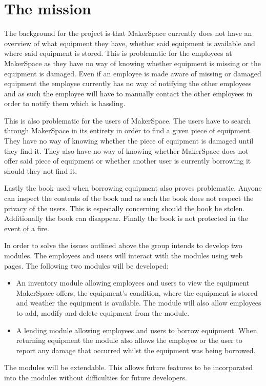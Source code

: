 \section{The mission}
The background for the project is that MakerSpace currently does not have an overview of what equipment they have, whether said equipment is available and where said equipment is stored.
This is problematic for the employees at MakerSpace as they have no way of knowing whether equipment is missing or the equipment is damaged.
Even if an employee is made aware of missing or damaged equipment the employee currently has no way of notifying the other employees and as such the employee will have to manually contact the other employees in order to notify them which is hassling.

This is also problematic for the users of MakerSpace.
The users have to search through MakerSpace in its entirety in order to find a given piece of equipment.
They have no way of knowing whether the piece of equipment is damaged until they find it.
They also have no way of knowing whether MakerSpace does not offer said piece of equipment or whether another user is currently borrowing it should they not find it.

Lastly the book used when borrowing equipment also proves problematic.
Anyone can inspect the contents of the book and as such the book does not respect the privacy of the users.
This is especially concerning should the book be stolen.
Additionally the book can disappear.
Finally the book is not protected in the event of a fire.

In order to solve the issues outlined above the group intends to develop two modules.
The employees and users will interact with the modules using web pages.
The following two modules will be developed:
\begin{itemize}
    \item An inventory module allowing employees and users to view the equipment MakerSpace offers, the equipment's condition, where the equipment is stored and weather the equipment is available.
    The module will also allow employees to add, modify and delete equipment from the module.
    \item A lending module allowing employees and users to borrow equipment.
    When returning equipment the module also allows the employee or the user to report any damage that occurred whilst the equipment was being borrowed.
\end{itemize}

The modules will be extendable.
This allows future features to be incorporated into the modules without difficulties for future developers.

